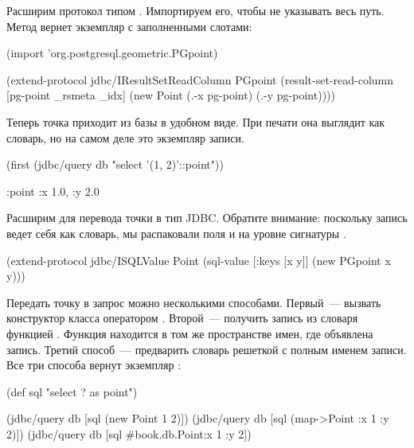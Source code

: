 Расширим протокол  типом . Импортируем его, чтобы не указывать весь путь. Метод  вернет экземпляр  с заполненными слотами:

\begin{english}
  \begin{clojure}
(import 'org.postgresql.geometric.PGpoint)

(extend-protocol jdbc/IResultSetReadColumn
  PGpoint
  (result-set-read-column [pg-point _rsmeta _idx]
    (new Point (.-x pg-point)
               (.-y pg-point))))
  \end{clojure}
\end{english}

Теперь точка приходит из базы в удобном виде. При печати она выглядит как словарь, но на самом деле это экземпляр записи.


\begin{english}
  \begin{clojure}
(first
  (jdbc/query db "select '(1, 2)'::point"))

{:point {:x 1.0, :y 2.0}}
  \end{clojure}
\end{english}

Расширим  для перевода точки в тип JDBC. Обратите внимание: поскольку запись ведет себя как словарь, мы распаковали поля  и  на уровне сигнатуры .

\begin{english}
  \begin{clojure/lines}
(extend-protocol jdbc/ISQLValue
  Point
  (sql-value [{:keys [x y]}]
    (new PGpoint x y)))
  \end{clojure/lines}
\end{english}

Передать точку в запрос можно несколькими способами. Первый~--- вызвать конструктор класса оператором . Второй~--- получить запись из словаря функцией . Функция находится в том же пространстве имен, где объявлена запись. Третий способ~--- предварить словарь решеткой с полным именем записи. Все три способа вернут экземпляр :

\begin{english}
  \begin{clojure}
(def sql "select ? as point")

(jdbc/query db [sql (new Point 1 2)])
(jdbc/query db [sql (map->Point {:x 1 :y 2})])
(jdbc/query db [sql #book.db.Point{:x 1 :y 2}])
  \end{clojure}
\end{english}


